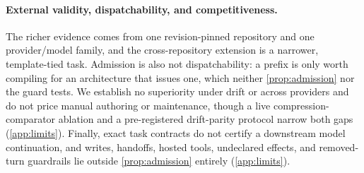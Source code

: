 \paragraph{External validity, dispatchability, and competitiveness.}
The richer evidence comes from one revision-pinned repository and one
provider/model family, and the cross-repository extension is a narrower,
template-tied task. Admission is also not dispatchability: a prefix is only worth
compiling for an architecture that issues one, which neither
\cref{prop:admission} nor the guard tests. We establish no superiority under
drift or across providers and do not price manual authoring or maintenance,
though a live compression-comparator ablation and a pre-registered
drift-parity protocol narrow both gaps (\cref{app:limits}).
Finally, exact task contracts do not certify a downstream model continuation, and
writes, handoffs, hosted tools, undeclared effects, and removed-turn guardrails
lie outside \cref{prop:admission} entirely (\cref{app:limits}).
